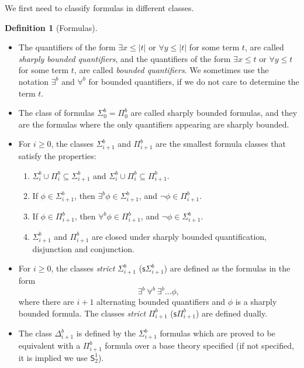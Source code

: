 \documentclass[11pt]{article}
\newcommand{\SOT}{\mathsf{S}^1_2}
\newcommand{\abs}[1]{\lvert #1 \rvert}
\theoremstyle{definition}
\theoremstyle{definition}
\newtheorem{definition}[theorem]{Definition}
\theoremstyle{remark}
\begin{document}
We first need to classify formulas in different classes.
\vspace{-0.5em}
\begin{definition}[Formulas]
\hfill 
\vspace{-0.5em}
\begin{itemize}
    \item The quantifiers of the form $\exists x\leq \abs{t}$ or $\forall y\leq \abs{t}$ for some term $t$, are called \emph{sharply bounded quantifiers}, and the quantifiers of the form $\exists x\leq t$ or $\forall y\leq t$ for some term $t$, are called \emph{bounded quantifiers}. We sometimes use the notation $\exists^b$ and $\forall^b$ for bounded quantifiers, if we do not care to determine the term $t$.
    \item The class of formulas $\Sigma^b_0=\Pi^b_0$ are called sharply bounded formulas, and they are the formulas where the only quantifiers appearing are sharply bounded.
    \item For $i\geq 0$, the classes $\Sigma^b_{i+1}$ and $\Pi^b_{i+1}$ are the smallest formula classes that satisfy the properties:
    \begin{enumerate}
        \item $\Sigma^b_{i}\cup \Pi^b_i\subseteq \Sigma^b_{i+1}$ and $\Sigma^b_{i}\cup \Pi^b_i\subseteq \Pi^b_{i+1}$.
        \item If $\phi\in \Sigma^b_{i+1}$, then $\exists^b\phi\in \Sigma^b_{i+1}$, and $\neg \phi \in \Pi^b_{i+1}$.
        \item If $\phi\in \Pi^b_{i+1}$, then $\forall^b\phi\in \Pi^b_{i+1}$, and $\neg \phi \in \Sigma^b_{i+1}$.
        \item $\Sigma^b_{i+1}$ and $\Pi^b_{i+1}$ are closed under sharply bounded quantification, disjunction and conjunction.
    \end{enumerate}
    \item For $i\geq 0$, the classes \emph{strict} $\Sigma^b_{i+1}$ ($\mathsf{s}\Sigma^b_{i+1}$) are defined as the formulas in the form
    $$
    \exists^b\:\forall^b\:\exists^b\dots \phi,
    $$
    where there are $i+1$ alternating bounded quantifiers and $\phi$ is a sharply bounded formula. The classes \emph{strict} $\Pi^b_{i+1}$ ($\mathsf{s}\Pi^b_{i+1}$) are defined dually.
    \item The class $\Delta^b_{i+1}$ is defined by the $\Sigma^b_{i+1}$ formulas which are proved to be equivalent with a $\Pi^b_{i+1}$ formula over a base theory specified (if not specified, it is implied we use $\SOT$).
\end{itemize}
\end{definition}
\end{document}
